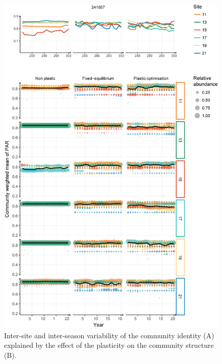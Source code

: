 \begin{figure}\label{fig:explain_strat}
\includegraphics[]{./2_PP/Figures/Comm/explain_par_variability.png}
\caption[Effect of the community structure on the inter-site variability of the community identity.]{Inter-site and inter-season variability of the community identity (A) explained by the effect of the plasticity on the community structure (B).}
\end{figure}
 



